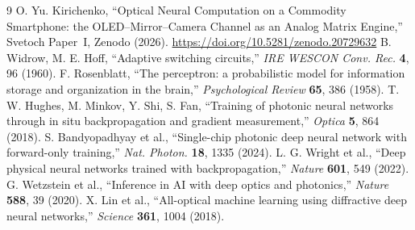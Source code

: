 \documentclass[11pt]{article}
\begin{document}
\begin{thebibliography}{9}\small
{} O. Yu. Kirichenko, ``Optical Neural Computation on a Commodity Smartphone: the OLED--Mirror--Camera Channel as an Analog Matrix Engine,'' Svetoch Paper~I, Zenodo (2026). \url{https://doi.org/10.5281/zenodo.20729632}
 B. Widrow, M. E. Hoff, ``Adaptive switching circuits,'' \emph{IRE WESCON Conv. Rec.} \textbf{4}, 96 (1960).
 F. Rosenblatt, ``The perceptron: a probabilistic model for information storage and organization in the brain,'' \emph{Psychological Review} \textbf{65}, 386 (1958).
 T. W. Hughes, M. Minkov, Y. Shi, S. Fan, ``Training of photonic neural networks through in situ backpropagation and gradient measurement,'' \emph{Optica} \textbf{5}, 864 (2018).
 S. Bandyopadhyay et al., ``Single-chip photonic deep neural network with forward-only training,'' \emph{Nat. Photon.} \textbf{18}, 1335 (2024).
 L. G. Wright et al., ``Deep physical neural networks trained with backpropagation,'' \emph{Nature} \textbf{601}, 549 (2022).
 G. Wetzstein et al., ``Inference in AI with deep optics and photonics,'' \emph{Nature} \textbf{588}, 39 (2020).
 X. Lin et al., ``All-optical machine learning using diffractive deep neural networks,'' \emph{Science} \textbf{361}, 1004 (2018).
\end{thebibliography}

\svetochfooter
\end{document}
